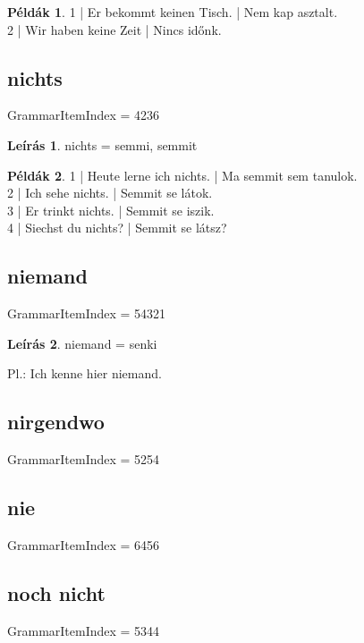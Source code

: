 \documentclass{article}
\theoremstyle{definition}
\newtheorem*{exmp}{Példák}
\newtheorem*{desc}{Leírás}
\begin{document}
\begin{exmp}
1 | Er bekommt keinen Tisch. | Nem kap asztalt.\\
2 | Wir haben keine Zeit | Nincs időnk.\\
\end{exmp}

\subsection{nichts}

GrammarItemIndex = 4236

\begin{desc}
nichts = semmi, semmit
\end{desc}

\begin{exmp}
1 | Heute lerne ich nichts. | Ma semmit sem tanulok.\\
2 | Ich sehe nichts. | Semmit se látok.\\
3 | Er trinkt nichts. | Semmit se iszik.\\
4 | Siechst du nichts? | Semmit se látsz?\\
\end{exmp}

\subsection{niemand}

GrammarItemIndex = 54321

\begin{desc}
niemand = senki

Pl.: Ich kenne hier niemand.
\end{desc}

\subsection{nirgendwo}

GrammarItemIndex = 5254

\subsection{nie}

GrammarItemIndex = 6456

\subsection{noch nicht}

GrammarItemIndex = 5344
\end{document}
